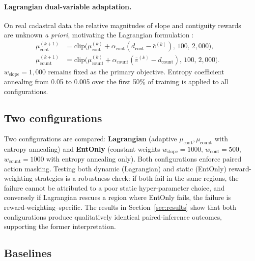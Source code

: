 \documentclass[]{interact}
\theoremstyle{plain}
\begin{document}
\paragraph{Lagrangian dual-variable adaptation.} On real cadastral data the relative magnitudes of slope and contiguity rewards are unknown \emph{a priori}, motivating the Lagrangian formulation \citep{stooke2020responsive,tessler2019reward}:
\begin{align}
\mu_{\text{cont}}^{(k+1)} &= \mathrm{clip}\big(\mu_{\text{cont}}^{(k)} + \alpha_{\text{cont}} (d_{\text{cont}} - \bar{c}^{(k)}),\, 100,\, 2{,}000\big),\\
\mu_{\text{count}}^{(k+1)} &= \mathrm{clip}\big(\mu_{\text{count}}^{(k)} + \alpha_{\text{count}} (\bar{v}^{(k)} - d_{\text{count}}),\, 100,\, 2{,}000\big).
\end{align}
$w_{\text{slope}} = 1{,}000$ remains fixed as the primary objective. Entropy coefficient annealing from 0.05 to 0.005 over the first 50\% of training is applied to all configurations.

\subsection{Two configurations}

Two configurations are compared: \textbf{Lagrangian} (adaptive $\mu_{\text{cont}}, \mu_{\text{count}}$ with entropy annealing) and \textbf{EntOnly} (constant weights $w_{\text{slope}}=1000$, $w_{\text{cont}}=500$, $w_{\text{count}}=1000$ with entropy annealing only). Both configurations enforce paired action masking. Testing both dynamic (Lagrangian) and static (EntOnly) reward-weighting strategies is a robustness check: if both fail in the same regions, the failure cannot be attributed to a poor static hyper-parameter choice, and conversely if Lagrangian rescues a region where EntOnly fails, the failure is reward-weighting--specific. The results in Section~\ref{sec:results} show that both configurations produce qualitatively identical paired-inference outcomes, supporting the former interpretation.

\subsection{Baselines}
\end{document}

